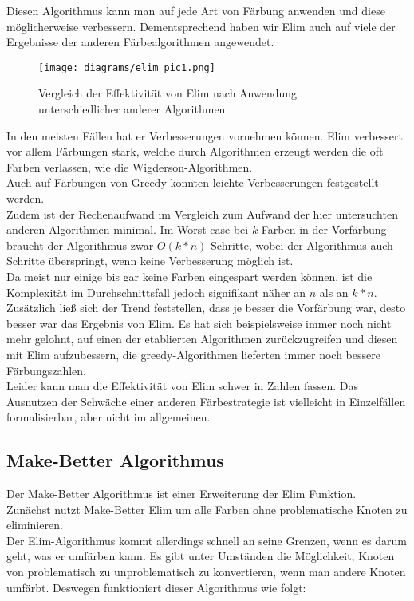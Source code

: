 \documentclass[11pt]{article}
\begin{document}
Diesen Algorithmus kann man auf jede Art von Färbung anwenden und diese möglicherweise verbessern. Dementsprechend haben wir Elim auch auf viele der Ergebnisse der anderen Färbealgorithmen angewendet. \\
\begin{figure}
  \texttt{[image: diagrams/elim\_pic1.png]}
  \caption{Vergleich der Effektivität von Elim nach Anwendung unterschiedlicher anderer Algorithmen}
  \label{fig:elim1}
\end{figure}
In den meisten Fällen hat er Verbesserungen vornehmen können. 
Elim verbessert vor allem Färbungen stark, welche durch Algorithmen erzeugt werden die oft Farben verlassen, wie die Wigderson-Algorithmen. \\
Auch auf Färbungen von Greedy konnten leichte Verbesserungen festgestellt werden. \\
Zudem ist der Rechenaufwand im Vergleich zum Aufwand der hier untersuchten anderen Algorithmen minimal. Im Worst case bei $k$ Farben
in der Vorfärbung braucht der Algorithmus zwar $O(k*n)$ Schritte, wobei der Algorithmus auch Schritte überspringt, wenn keine Verbesserung möglich ist.\\
Da meist nur einige bis gar keine Farben eingespart werden können, ist die Komplexität im Durchschnittsfall jedoch signifikant näher an $n$ als an $k*n$. \\
Zusätzlich ließ sich der Trend feststellen, dass je besser die Vorfärbung war, desto besser war das Ergebnis von Elim. Es hat sich beispielsweise immer noch nicht mehr gelohnt, auf einen der etablierten
Algorithmen zurückzugreifen und diesen mit Elim aufzubessern, die greedy-Algorithmen lieferten immer noch bessere Färbungszahlen. \\
Leider kann man die Effektivität von Elim schwer in Zahlen fassen. Das Ausnutzen der Schwäche einer anderen Färbestrategie ist vielleicht in Einzelfällen formalisierbar, aber nicht im allgemeinen.

\subsection{Make-Better Algorithmus}

Der Make-Better Algorithmus ist einer Erweiterung der Elim Funktion. \\
Zunächst nutzt Make-Better Elim um alle Farben ohne problematische Knoten zu eliminieren. \\

Der Elim-Algorithmus kommt allerdings schnell an seine Grenzen, 
wenn es darum geht, was er umfärben kann. 
Es gibt unter Umständen die Möglichkeit,
Knoten von problematisch zu unproblematisch zu konvertieren, 
wenn man andere Knoten umfärbt. 
Deswegen funktioniert dieser Algorithmus wie folgt: \\
\end{document}
